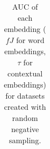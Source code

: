\documentclass[letterpaper]{article} %
\begin{document}
\begin{table}[h]
\begin{tabular}{l l l l l l l l l l l}
    \end{tabular}     
    \caption{AUC of each embedding ($fJ$ for word embeddings, $\tau$ for contextual embeddings) for datasets created with random negative sampling.}
    \label{tab:newDatasets_auc_negR} 
\end{table}
\end{document}
